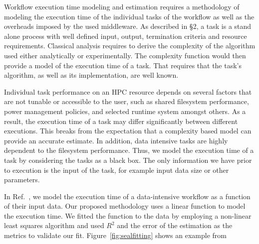 Workflow execution time modeling and estimation requires a methodology of 
modeling the execution time of the individual tasks of the workflow as well as 
the overheads imposed by the used middleware. As described in \S2, a task is a 
stand alone process with well defined input, output, termination criteria and 
resource requirements. Classical analysis requires to derive the complexity of 
the algorithm used either analytically or experimentally. The complexity 
function would then provide a model of the execution time of a task. That 
requires that the task's algorithm, as well as its implementation, are well 
known. 

Individual task performance on an HPC resource depends on several factors that 
are not tunable or accessible to the user, such as shared filesystem 
performance, power management policies, and selected runtime system amongst 
others. As a result, the execution time of a task may differ significantly 
between different executions. This breaks from the expectation that a complexity 
based model can provide an accurate estimate. In addition, data intensive tasks 
are highly dependent to the filesystem performance. Thus, we model the 
execution time of a task by considering the tasks as a black box. The only 
information we have prior to execution is the input of the task, for example 
input data size or other parameters.

In Ref.~\cite{paraskevakos2019workflow}, we model the execution time of a 
data-intensive workflow as a function of their input data. Our proposed 
methodology uses a linear function to model the execution time. We fitted the 
function to the data by employing a non-linear least squares algorithm and used 
$R^{2}$ and the error of the estimation as the metrics to validate our fit.
Figure~\ref{fig:sealfitting} shows an example from 

